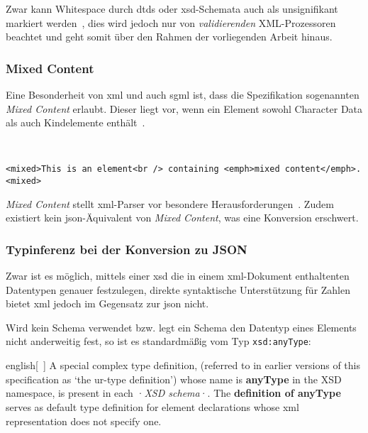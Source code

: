 Zwar kann Whitespace durch \glspl{dtd} oder \acrshort{xsd}-Schemata auch als unsignifikant markiert werden~\cite{page2005whitespace}, dies wird jedoch nur von \emph{validierenden} XML-Prozessoren beachtet und geht somit über den Rahmen der vorliegenden Arbeit hinaus.

\subsubsection{Mixed Content}
\label{sec:mixedcontent}

Eine Besonderheit von \acrshort{xml} und auch \acrshort{sgml} ist, dass die Spezifikation sogenannten \emph{Mixed Content} erlaubt. Dieser liegt vor, wenn ein Element sowohl Character Data als auch Kindelemente enthält~\cite[Abschnitt 3.2.2]{maler2008xml}.

\begin{example}~
    \begin{verbatim}
<mixed>This is an element<br /> containing <emph>mixed content</emph>.<mixed>
    \end{verbatim}
\end{example}

\emph{Mixed Content} stellt \acrshort{xml}-Parser vor besondere Herausforderungen~\cite{mcgrath2002mixedcontent}. Zudem existiert kein \acrshort{json}-Äquivalent von \emph{Mixed Content}, was eine Konversion erschwert.

\subsubsection{Typinferenz bei der Konversion zu JSON}

Zwar ist es möglich, mittels einer \acrfull{xsd} die in einem \acrshort{xml}-Dokument enthaltenten Datentypen genauer festzulegen, direkte syntaktische Unterstützung für Zahlen bietet \acrshort{xml} jedoch im Gegensatz zur \acrlong{json} nicht.

Wird kein Schema verwendet bzw. legt ein Schema den Datentyp eines Elements nicht anderweitig fest, so ist es standardmäßig vom Typ \texttt{xsd:anyType}:

\begin{foreigndisplayquote}{english}[{~\cite[Abschnitt 2.2.1.1]{xmlschema11-1}}]
    A special complex type definition, (referred to in earlier versions of this specification as `the ur-type definition') whose name is \textbf{anyType} in the XSD namespace, is present in each ·\emph{XSD schema}·. The \textbf{definition of anyType} serves as default type definition for element declarations whose \acrshort{xml} representation does not specify one.
\end{foreigndisplayquote}

